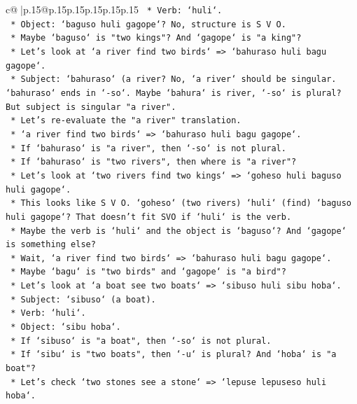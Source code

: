 \documentclass{article}
\begin{document}
{\begin{supertabular}{c@{$\;$}|p{.15\linewidth}@{}p{.15\linewidth}p{.15\linewidth}p{.15\linewidth}p{.15\linewidth}p{.15\linewidth}}
{{{\texttt{        *   Verb: `huli`.} \\
\texttt{        *   Object: `baguso huli gagope`? No, structure is S V O.} \\
\texttt{        *   Maybe `baguso` is "two kings"? And `gagope` is "a king"?} \\
\texttt{        *   Let's look at `a river find two birds` => `bahuraso huli bagu gagope`.} \\
\texttt{        *   Subject: `bahuraso` (a river? No, `a river` should be singular. `bahuraso` ends in `{-}so`. Maybe `bahura` is river, `{-}so` is plural? But subject is singular "a river".} \\
\texttt{        *   Let's re{-}evaluate the "a river" translation.} \\
\texttt{        *   `a river find two birds` => `bahuraso huli bagu gagope`.} \\
\texttt{        *   If `bahuraso` is "a river", then `{-}so` is not plural.} \\
\texttt{        *   If `bahuraso` is "two rivers", then where is "a river"?} \\
\texttt{        *   Let's look at `two rivers find two kings` => `goheso huli baguso huli gagope`.} \\
\texttt{        *   This looks like S V O. `goheso` (two rivers) `huli` (find) `baguso huli gagope`? That doesn't fit SVO if `huli` is the verb.} \\
\texttt{        *   Maybe the verb is `huli` and the object is `baguso`? And `gagope` is something else?} \\
\texttt{        *   Wait, `a river find two birds` => `bahuraso huli bagu gagope`.} \\
\texttt{        *   Maybe `bagu` is "two birds" and `gagope` is "a bird"?} \\
\texttt{        *   Let's look at `a boat see two boats` => `sibuso huli sibu hoba`.} \\
\texttt{        *   Subject: `sibuso` (a boat).} \\
\texttt{        *   Verb: `huli`.} \\
\texttt{        *   Object: `sibu hoba`.} \\
\texttt{        *   If `sibuso` is "a boat", then `{-}so` is not plural.} \\
\texttt{        *   If `sibu` is "two boats", then `{-}u` is plural? And `hoba` is "a boat"?} \\
\texttt{        *   Let's check `two stones see a stone` => `lepuse lepuseso huli hoba`.} \\
}}}
\end{supertabular}}
\end{document}
